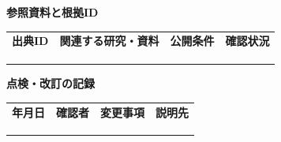 \documentclass[11pt,a4paper]{article}
\begin{document}
\par{}\noindent\textbf{参照資料と根拠ID}\par\vspace{1mm}
{\fontsize{8.5}{13}\selectfont
\begin{tabularx}{\linewidth}{@{}XXXX@{}}
\textbf{出典ID} & \textbf{関連する研究・資料} & \textbf{公開条件} & \textbf{確認状況}\\[2mm]
\strut & \strut & \strut & \strut\\[5mm]
\strut & \strut & \strut & \strut\\[5mm]
\strut & \strut & \strut & \strut\\[5mm]
\end{tabularx}
}\vspace{2mm}\par
{}
\par{}\noindent\textbf{点検・改訂の記録}\par\vspace{1mm}
{\fontsize{8.5}{13}\selectfont
\begin{tabularx}{\linewidth}{@{}XXXX@{}}
\textbf{年月日} & \textbf{確認者} & \textbf{変更事項} & \textbf{説明先}\\[2mm]
\strut & \strut & \strut & \strut\\[5mm]
\strut & \strut & \strut & \strut\\[5mm]
\strut & \strut & \strut & \strut\\[5mm]
\end{tabularx}
}\vspace{2mm}\par
\end{document}
